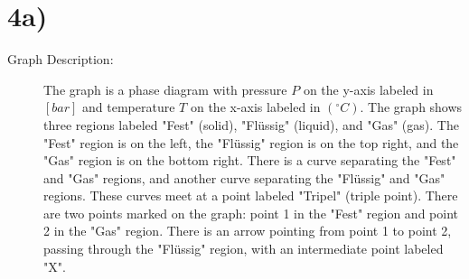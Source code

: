 

\section*{4a)}

\begin{description}
    \item[Graph Description:] The graph is a phase diagram with pressure \( P \) on the y-axis labeled in \([bar]\) and temperature \( T \) on the x-axis labeled in \((^\circ C)\). The graph shows three regions labeled "Fest" (solid), "Flüssig" (liquid), and "Gas" (gas). The "Fest" region is on the left, the "Flüssig" region is on the top right, and the "Gas" region is on the bottom right. There is a curve separating the "Fest" and "Gas" regions, and another curve separating the "Flüssig" and "Gas" regions. These curves meet at a point labeled "Tripel" (triple point). There are two points marked on the graph: point 1 in the "Fest" region and point 2 in the "Gas" region. There is an arrow pointing from point 1 to point 2, passing through the "Flüssig" region, with an intermediate point labeled "X".
\end{description}